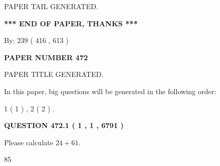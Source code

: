 \documentclass[12pt]{article}
\begin{document}
   
   
   
   
   
 \vspace{0.2in}
 
   
   
\vspace{2.0in} PAPER TAIL GENERATED.
   
   
   
   
\vspace{1.0in} 
{\textbf{\large{ *** END OF PAPER, THANKS *** }}} 
   
   
\hspace{1.0in} By: 
 239 ( 416 ,  613 )
   
   
   
   
\newpage 
\setcounter{page}{ 
   472001 } 
   
   
   
   
 {\textbf{ \Large{ PAPER NUMBER  472  }}}
   
   
\vspace{0.2in}
   
   
   
   
   
   
   
   
 \vspace{0.2in}
 
 
 
 
   
   
 PAPER TITLE GENERATED.
   
   
   
\vspace{0.2in}
   
In this paper, big questions will be generated in the following order: 
   
   
   1 ( 1 )
 ,
   2 ( 2 )
 .
  
\vspace{0.2in}
  
{\textbf{\Large{QUESTION
472.1 
 ( 1 , 1 , 6791 )
}}}
  
  
 
Please calculate $ %
24 +  %
61 $.
 
 
 
\noindent{}
 
 

85
 
 
\noindent{}
 
\end{document}

